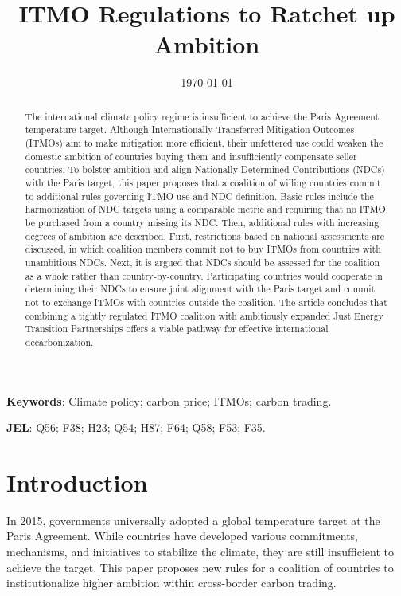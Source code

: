 ﻿\documentclass[12pt,english]{article}
\title{ITMO Regulations to Ratchet up Ambition
} %
\date{\today} %
\begin{document}
\sloppy
\maketitle

\begin{abstract} %
The %
international climate policy regime is insufficient to achieve the Paris Agreement temperature target. Although Internationally Transferred Mitigation Outcomes (ITMOs) aim to make mitigation more efficient, their unfettered use could weaken the domestic ambition of countries buying them and insufficiently compensate seller countries. To bolster ambition and align Nationally Determined Contributions (NDCs) with the Paris target, this paper proposes that a coalition of willing countries commit to additional rules governing ITMO use and NDC definition. Basic rules include the harmonization of NDC targets using a comparable metric and requiring that no ITMO be purchased from a country missing its NDC. Then, additional rules with increasing degrees of ambition are described. First, restrictions based on national assessments are discussed, in which coalition members commit not to buy ITMOs from countries with unambitious NDCs. Next, it is argued that NDCs should be assessed for the coalition as a whole rather than country-by-country. Participating countries would cooperate in determining their NDCs to ensure joint alignment with the Paris target and commit not to exchange ITMOs with countries outside the coalition. 
The article concludes that combining a tightly regulated ITMO coalition with ambitiously expanded Just Energy Transition Partnerships offers a viable pathway for effective international decarbonization.
\end{abstract}

\textbf{Keywords}: Climate policy; carbon price; ITMOs; carbon trading.%

\textbf{JEL}: Q56; F38; H23; Q54; H87; F64; Q58; F53; F35.

\clearpage

\section*{Introduction}
In 2015, governments universally adopted a global temperature target at the Paris Agreement. While countries have developed various commitments, mechanisms, and initiatives to stabilize the climate, they are still insufficient to achieve the target. This paper proposes new rules for a coalition of countries to institutionalize higher ambition within cross-border carbon trading.
\end{document}
